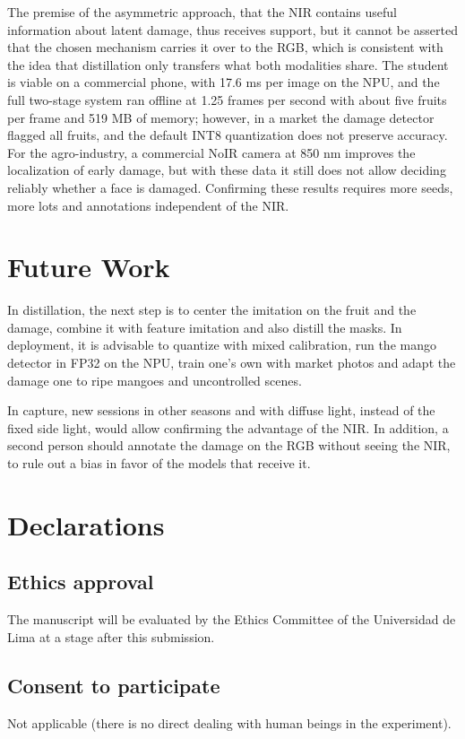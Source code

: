\documentclass[journal]{IEEEtran}
\begin{document}
The premise of the asymmetric approach, that the NIR contains useful information about latent damage, thus receives support, but it cannot be asserted that the chosen mechanism carries it over to the RGB, which is consistent with the idea that distillation only transfers what both modalities share. The student is viable on a commercial phone, with 17.6 ms per image on the NPU, and the full two-stage system ran offline at 1.25 frames per second with about five fruits per frame and 519 MB of memory; however, in a market the damage detector flagged all fruits, and the default INT8 quantization does not preserve accuracy. For the agro-industry, a commercial NoIR camera at 850 nm improves the localization of early damage, but with these data it still does not allow deciding reliably whether a face is damaged. Confirming these results requires more seeds, more lots and annotations independent of the NIR.

\section{Future Work}\label{sec:future}
In distillation, the next step is to center the imitation on the fruit and the damage, combine it with feature imitation and also distill the masks. In deployment, it is advisable to quantize with mixed calibration, run the mango detector in FP32 on the NPU, train one's own with market photos and adapt the damage one to ripe mangoes and uncontrolled scenes.

In capture, new sessions in other seasons and with diffuse light, instead of the fixed side light, would allow confirming the advantage of the NIR. In addition, a second person should annotate the damage on the RGB without seeing the NIR, to rule out a bias in favor of the models that receive it.

\section*{Declarations}
\subsection*{Ethics approval}
The manuscript will be evaluated by the Ethics Committee of the Universidad de Lima at a stage after this submission.

\subsection*{Consent to participate}
Not applicable (there is no direct dealing with human beings in the experiment).
\end{document}
